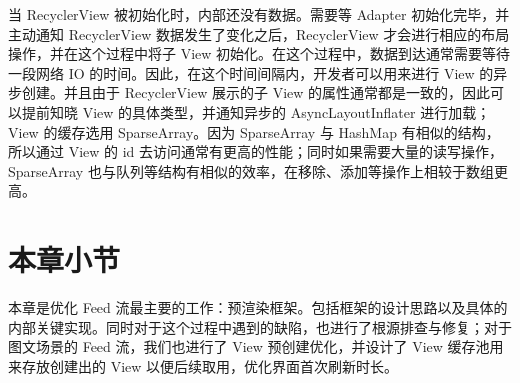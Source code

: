 当 RecyclerView 被初始化时，内部还没有数据。需要等 Adapter 初始化完毕，并主动通知 RecyclerView 数据发生了变化之后，RecyclerView 才会进行相应的布局操作，并在这个过程中将子 View 初始化。在这个过程中，数据到达通常需要等待一段网络 IO 的时间。因此，在这个时间间隔内，开发者可以用来进行 View 的异步创建。并且由于 RecyclerView 展示的子 View 的属性通常都是一致的，因此可以提前知晓 View 的具体类型，并通知异步的 AsyncLayoutInflater 进行加载；View 的缓存选用 SparseArray。因为 SparseArray 与 HashMap 有相似的结构，所以通过 View 的 id 去访问通常有更高的性能；同时如果需要大量的读写操作，SparseArray 也与队列等结构有相似的效率，在移除、添加等操作上相较于数组更高。

\section{本章小节}

本章是优化 Feed 流最主要的工作：预渲染框架。包括框架的设计思路以及具体的内部关键实现。同时对于这个过程中遇到的缺陷，也进行了根源排查与修复；对于图文场景的 Feed 流，我们也进行了 View 预创建优化，并设计了 View 缓存池用来存放创建出的 View 以便后续取用，优化界面首次刷新时长。
